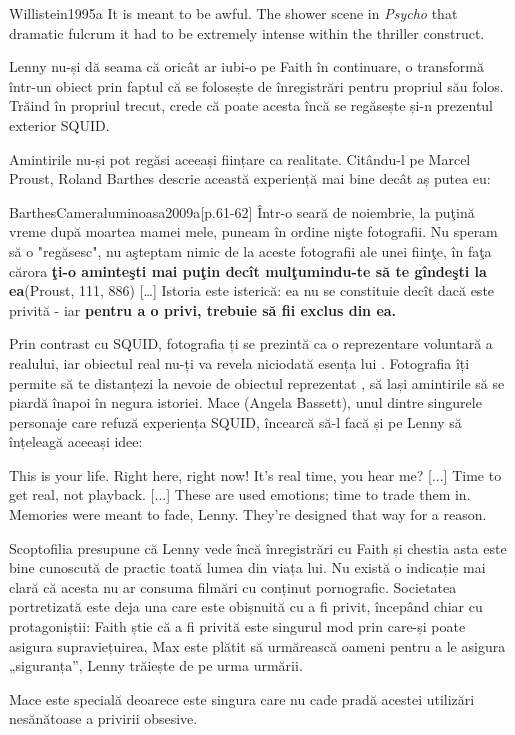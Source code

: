 \documentclass[12pt]{article}
\begin{document}
	\begin{displaycquote}{Willistein1995a}
		It is meant to be awful. The shower scene in \textit{Psycho} \textemdash that dramatic fulcrum \textemdash it had to be extremely intense within the thriller construct.
	\end{displaycquote}
	
	Lenny nu-și dă seama că oricât ar iubi-o pe Faith în continuare, o transformă într-un obiect prin faptul că se folosește de înregistrări pentru propriul său folos. Trăind în propriul trecut, crede că poate acesta încă se regăsește și-n prezentul exterior SQUID.\par
	
	Amintirile nu-și pot regăsi aceeași ființare ca realitate. Citându-l pe Marcel Proust, Roland Barthes descrie această experiență mai bine decât aș putea eu:
	
	\begin{displaycquote}{BarthesCameraluminoasa2009a}[p.61-62]
			Într-o seară de noiembrie, la puţină vreme după moartea mamei mele, puneam în ordine nişte fotografii. Nu speram să o "regăsesc", nu aşteptam nimic de la \guillemetleft aceste fotografii ale unei fiinţe, în faţa cărora \textbf{ţi-o aminteşti mai puţin decît mulţumindu-te să te gîndeşti la ea}\guillemetright  (Proust, 111, 886) […] Istoria este isteri­că: ea nu se constituie decît dacă este privită - iar \textbf{pentru a o privi, trebuie să fii exclus din ea.}
	\end{displaycquote}
	
	Prin contrast cu SQUID, fotografia ți se prezintă ca o reprezentare voluntară a realului, iar obiectul real nu-ți va revela niciodată esența lui \cite{BarthesCameraluminoasa2009a}. Fotografia îți permite să te distanțezi la nevoie de obiectul reprezentat \cite{secSontagPlatosCavea}, să lași amintirile să se piardă înapoi în negura istoriei. Mace (Angela Bassett), unul dintre singurele personaje care refuză experiența SQUID, încearcă să-l facă și pe Lenny să înțeleagă aceeași idee:
	
	\begin{displayquote}
		This is your life. Right here, right now! It’s real time, you hear me? [...] Time to get real, not playback. [...] These are used emotions; time to trade them in. Memories were meant to fade, Lenny. They’re designed that way for a reason.
	\end{displayquote}
	
	Scoptofilia presupune că Lenny vede încă înregistrări cu Faith și chestia asta este bine cunoscută de practic toată lumea din viața lui. Nu există o indicație mai clară că acesta nu ar consuma filmări cu conținut pornografic. Societatea portretizată este deja una care este obișnuită cu a fi privit, începând chiar cu protagoniștii: Faith știe că a fi privită este singurul mod prin care-și poate asigura supraviețuirea, Max este plătit să urmărească oameni pentru a le asigura „siguranța”, Lenny trăiește de pe urma urmării.\par
	
	Mace este specială deoarece este singura care nu cade pradă acestei utilizări nesănătoase a privirii obsesive.\par	
	\printbibliography
	
\end{document}
